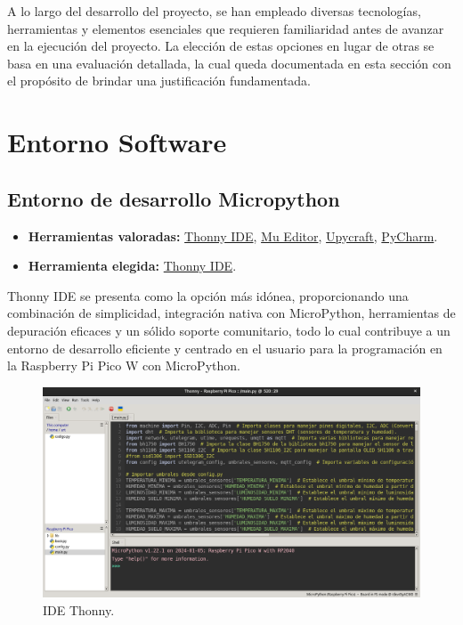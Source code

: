 
A lo largo del desarrollo del proyecto, se han empleado diversas tecnologías, herramientas y elementos esenciales que requieren familiaridad antes de avanzar en la ejecución del proyecto. La elección de estas opciones en lugar de otras se basa en una evaluación detallada, la cual queda documentada en esta sección con el propósito de brindar una justificación fundamentada.

\section{Entorno Software}
\subsection{Entorno de desarrollo Micropython}\label{4:MicroPython}
\begin{itemize}
	\item \textbf{Herramientas valoradas:} \href{https://thonny.org/}{Thonny IDE}, \href{https://codewith.mu/}{Mu Editor}, \href{https://dfrobot.gitbooks.io/upycraft/content/}{Upycraft}, \href{https://www.jetbrains.com/pycharm/}{PyCharm}.
    \item \textbf{Herramienta elegida:} \href{https://thonny.org/}{Thonny IDE}.
\end{itemize}

Thonny IDE se presenta como la opción más idónea, proporcionando una combinación de simplicidad, integración nativa con MicroPython, herramientas de depuración eficaces y un sólido soporte comunitario, todo lo cual contribuye a un entorno de desarrollo eficiente y centrado en el usuario para la programación en la Raspberry Pi Pico W con MicroPython.

\begin{figure}[h]
    \centering
    \includegraphics[width=1\textwidth]{img/herramientas/thonny.png}
    \caption{IDE Thonny.} \label{Img:Thonny}
\end{figure}
 \pagebreak

